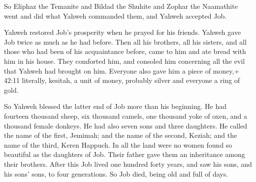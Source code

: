  So Eliphaz the Temanite and Bildad the Shuhite and Zophar
the Naamathite went and did what Yahweh commanded them, and Yahweh
accepted Job.

 Yahweh restored Job's prosperity when he prayed for his
friends. Yahweh gave Job twice as much as he had before. 
Then all his brothers, all his sisters, and all those who had been of
his acquaintance before, came to him and ate bread with him in his
house. They comforted him, and consoled him concerning all the evil that
Yahweh had brought on him. Everyone also gave him a piece of money,+
42:11 literally, kesitah, a unit of money, probably silver and everyone
a ring of gold.

 So Yahweh blessed the latter end of Job more than his
beginning. He had fourteen thousand sheep, six thousand camels, one
thousand yoke of oxen, and a thousand female donkeys.  He
had also seven sons and three daughters.  He called the
name of the first, Jemimah; and the name of the second, Keziah; and the
name of the third, Keren Happuch.  In all the land were no
women found so beautiful as the daughters of Job. Their father gave them
an inheritance among their brothers.  After this Job lived
one hundred forty years, and saw his sons, and his sons' sons, to four
generations.  So Job died, being old and full of days.
